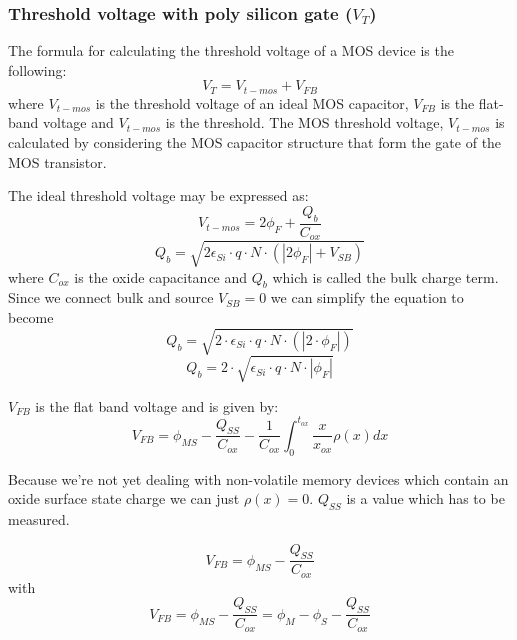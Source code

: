 \subsubsection{Threshold voltage with poly silicon gate ($V_T$)}
The formula for calculating the threshold voltage of a MOS device is the following:
\begin{equation}
V_T = V_{t-mos} + V_{FB}
\end{equation}
where $V_{t-mos}$ is the threshold voltage of an ideal MOS capacitor, $V_{FB}$ is the flat-band voltage and $V_{t-mos}$ is the threshold.
The MOS threshold voltage, $V_{t-mos}$ is calculated by considering the MOS capacitor structure that form the gate of the MOS transistor.

The ideal threshold voltage may be expressed as:
\begin{equation}
V_{t-mos}=2 \phi_F + \frac{Q_b}{C_{ox}}
\end{equation}
\begin{equation}
Q_b
=
\sqrt{2 \epsilon_{Si} \cdot q \cdot N  \cdot  ( \left| 2 \phi_F \right| + V_{SB}) }
\end{equation}
where $C_{ox}$ is the oxide capacitance and $Q_b$ which is called the bulk charge term.\\

Since we connect bulk and source $V_{SB}=0$ we can simplify the equation to become
\begin{equation}
Q_b
=
\sqrt{2\cdot\epsilon_{Si}\cdot q\cdot N \cdot  ( \left| 2 \cdot \phi_F \right|) }
\end{equation}
\begin{equation}
Q_b
=
2\cdot\sqrt{\epsilon_{Si}\cdot q\cdot N \cdot \left| \phi_F \right| }
\end{equation}


$V_{FB}$ is the flat band voltage and is given by:
\begin{equation}
V_{FB}
=
\phi_{MS}-\frac{Q_{SS}}{C_{ox}}-\frac{1}{C_{ox}}\int_{0}^{t_{ox}}\frac{x}{x_{ox}}\rho(x) dx
\end{equation}

Because we're not yet dealing with non-volatile memory devices which contain an oxide surface state charge we can just $\rho(x)=0$.
$Q_{SS}$ is a value which has to be measured.

\begin{equation}
V_{FB}
=
\phi_{MS} - \frac{Q_{SS}}{C_{ox}}
\end{equation}
with
\begin{equation}
V_{FB}
=
\phi_{MS} - \frac{Q_{SS}}{C_{ox}}
=
\phi_{M} - \phi_{S} - \frac{Q_{SS}}{C_{ox}}
\end{equation}

